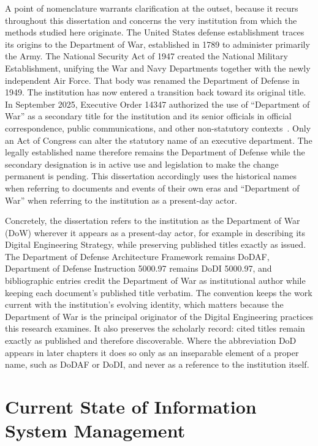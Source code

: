 A point of nomenclature warrants clarification at the outset, because it recurs throughout this dissertation and concerns the very institution from which the methods studied here originate. The United States defense establishment traces its origins to the Department of War, established in 1789 to administer primarily the Army. The National Security Act of 1947 created the National Military Establishment, unifying the War and Navy Departments together with the newly independent Air Force. That body was renamed the Department of Defense in 1949. The institution has now entered a transition back toward its original title. In September 2025, Executive Order 14347 authorized the use of ``Department of War'' as a secondary title for the institution and its senior officials in official correspondence, public communications, and other non-statutory contexts~\parencite{EO_14347_2025}. Only an Act of Congress can alter the statutory name of an executive department. The legally established name therefore remains the Department of Defense while the secondary designation is in active use and legislation to make the change permanent is pending. This dissertation accordingly uses the historical names when referring to documents and events of their own eras and ``Department of War'' when referring to the institution as a present-day actor.

Concretely, the dissertation refers to the institution as the Department of War (DoW) wherever it appears as a present-day actor, for example in describing its Digital Engineering Strategy, while preserving published titles exactly as issued. The Department of Defense Architecture Framework remains DoDAF, Department of Defense Instruction 5000.97 remains DoDI 5000.97, and bibliographic entries credit the Department of War as institutional author while keeping each document's published title verbatim. The convention keeps the work current with the institution's evolving identity, which matters because the Department of War is the principal originator of the Digital Engineering practices this research examines. It also preserves the scholarly record: cited titles remain exactly as published and therefore discoverable. Where the abbreviation DoD appears in later chapters it does so only as an inseparable element of a proper name, such as DoDAF or DoDI, and never as a reference to the institution itself.

\section{Current State of Information System Management}

